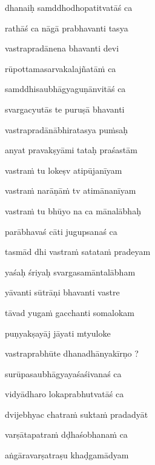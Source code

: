 \ujvers\nemsloka 
dhanaiḥ samddhodhopatitvatāś ca
\dontdisplaylinenum

\nemslokab 
rathāś ca nāgā prabhavanti tasya \danda\dontdisplaylinenum

\nemslokac 
vastrapradānena bhavanti devi
\dontdisplaylinenum

\nemslokad 
rūpottamasarvakalajñatā\.m ca \veg\dontdisplaylinenum

\ujvers\nemsloka 
samddhisaubhāgyaguṇānvitāś ca
\dontdisplaylinenum

\nemslokab 
svargacyutās te puruṣā bhavanti \danda\dontdisplaylinenum

\nemslokac 
vastrapradānābhiratasya pu\.msaḥ
\dontdisplaylinenum

\nemslokad 
anyat pravakṣyāmi tataḥ praśastām \veg\dontdisplaylinenum

\ujvers\nemsloka 
vastra\.m tu lokeṣv atipūjanīyam
\dontdisplaylinenum

\nemslokab 
vastra\.m narāṇā\.m tv atimānanīyam \danda\dontdisplaylinenum

\nemslokac 
vastra\.m tu bhūyo na ca mānalābhaḥ
\dontdisplaylinenum

\nemslokad 
parābhavaś cāti jugupsanaś ca \veg\dontdisplaylinenum

\ujvers\nemsloka 
tasmād dhi vastra\.m satata\.m pradeyam
\dontdisplaylinenum

\nemslokab 
yaśaḥ śriyaḥ svargasamāntalābham \danda\dontdisplaylinenum

\nemslokac 
yāvanti sūtrāṇi bhavanti vastre
\dontdisplaylinenum

\nemslokad 
tāvad yuga\.m gacchanti somalokam \veg\dontdisplaylinenum

\ujvers\nemsloka 
puṇyakṣayāj jāyati mtyuloke
\dontdisplaylinenum

\nemslokab 
vastraprabhūte dhanadhānyakīrṇo ? \danda\dontdisplaylinenum

\nemslokac 
surūpasaubhāgyayaśaśivanaś ca
\dontdisplaylinenum

\nemslokad 
vidyādharo lokaprabhutvatāś ca \veg\dontdisplaylinenum

\ujvers\nemsloka 
dvijebhyac chatra\.m sukta\.m pradadyāt
\dontdisplaylinenum

\nemslokab 
varṣātapatra\.m dḍhaśobhana\.m ca \danda\dontdisplaylinenum

\nemslokac 
aṅgāravarṣatraṣu khaḍgamādyam
\dontdisplaylinenum

